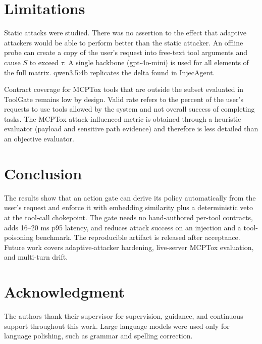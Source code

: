 \documentclass[a4paper,conference]{IEEEtran}
\begin{document}
\section{Limitations}

Static attacks were studied. There was no assertion to the effect that adaptive attackers would be able to perform better than the static attacker. An offline probe can create a copy of the user's request into free-text tool arguments and cause $S$ to exceed $\tau$. A single backbone (gpt-4o-mini) is used for all elements of the full matrix. qwen3.5:4b replicates the delta found in InjecAgent.

Contract coverage for MCPTox tools that are outside the subset evaluated in ToolGate remains low by design. Valid rate refers to the percent of the user's requests to use tools allowed by the system and not overall success of completing tasks. The MCPTox attack-influenced metric is obtained through a heuristic evaluator (payload and sensitive path evidence) and therefore is less detailed than an objective evaluator.

\section{Conclusion}

The results show that an action gate can derive its policy automatically from the user's request and enforce it with embedding similarity plus a deterministic veto at the tool-call chokepoint. The gate needs no hand-authored per-tool contracts, adds 16--20 ms p95 latency, and reduces attack success on an injection and a tool-poisoning benchmark. The reproducible artifact is released after acceptance. Future work covers adaptive-attacker hardening, live-server MCPTox evaluation, and multi-turn drift.

\section*{Acknowledgment}
The authors thank their supervisor for supervision, guidance, and continuous support throughout this work. Large language models were used only for language polishing, such as grammar and spelling correction.



\end{document}
